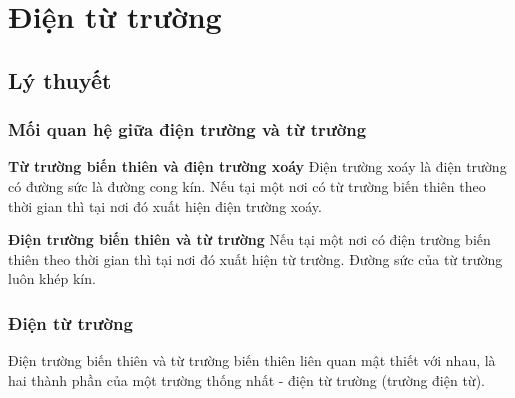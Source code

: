 \let\lesson\undefined
\newcommand{\lesson}{\phantomlesson{Bài 21: Điện từ trường}}
\chapter[Điện từ trường]{Điện từ trường}
\section{Lý thuyết}
\subsection{Mối quan hệ giữa điện trường và từ trường}
\textbf{Từ trường biến thiên và điện trường xoáy}
Điện trường xoáy là điện trường có đường sức là đường cong kín.
Nếu tại một nơi có từ trường biến thiên theo thời gian thì tại nơi đó xuất hiện điện trường xoáy.

\textbf{Điện trường biến thiên và từ trường}
Nếu tại một nơi có điện trường biến thiên theo thời gian thì tại nơi đó xuất hiện từ trường.
Đường sức của từ trường luôn khép kín.
\subsection {Điện từ trường }
Điện trường biến thiên và từ trường biến thiên liên quan mật thiết với nhau, là hai thành phần của một trường thống nhất - điện từ trường (trường điện từ).
